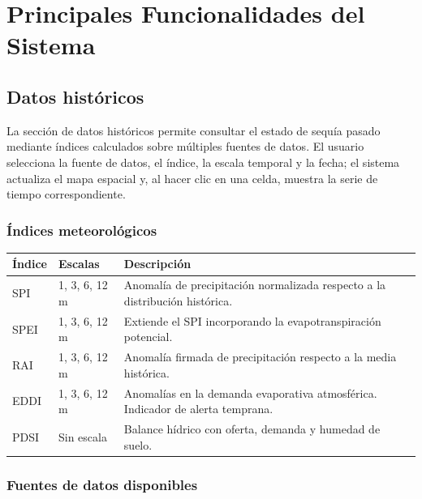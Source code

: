 \chapter{Principales Funcionalidades del Sistema}
\label{ch:funcionalidades}

\section{Datos históricos}
\label{sec:datos_historicos}

La sección de datos históricos permite consultar el estado de sequía pasado mediante índices calculados sobre múltiples fuentes de datos. El usuario selecciona la fuente de datos, el índice, la escala temporal y la fecha; el sistema actualiza el mapa espacial y, al hacer clic en una celda, muestra la serie de tiempo correspondiente.

\subsection{Índices meteorológicos}

\begin{center}
\small
\begin{tabular}{@{}lll@{}}
\toprule
\textbf{Índice} & \textbf{Escalas} & \textbf{Descripción} \\
\midrule
SPI  & 1, 3, 6, 12 m & Anomalía de precipitación normalizada respecto a la distribución histórica. \\
SPEI & 1, 3, 6, 12 m & Extiende el SPI incorporando la evapotranspiración potencial. \\
RAI  & 1, 3, 6, 12 m & Anomalía firmada de precipitación respecto a la media histórica. \\
EDDI & 1, 3, 6, 12 m & Anomalías en la demanda evaporativa atmosférica. Indicador de alerta temprana. \\
PDSI & Sin escala    & Balance hídrico con oferta, demanda y humedad de suelo. \\
\bottomrule
\end{tabular}
\end{center}

\subsection{Fuentes de datos disponibles}

